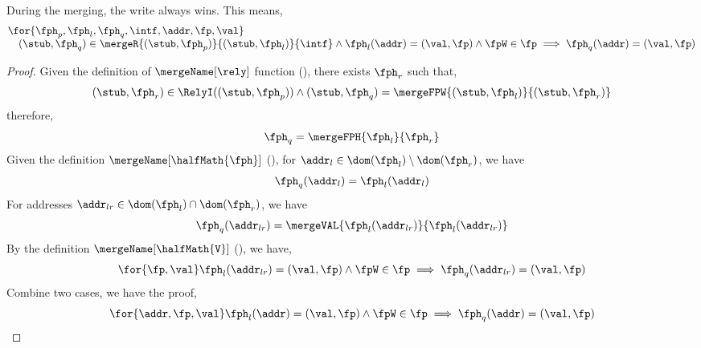 \begin{lem}
\label{lem:write-win-merge}
During the merging, the write always wins.
This means,
\[
\begin{array}{@{}l@{}}
    \for{\fph_{p}, \fph_{l}, \fph_{q}, \intf, \addr, \fp, \val} \\
    \quad (\stub, \fph_{q}) \in \mergeR{(\stub, \fph_{p})}{(\stub, \fph_{l})}{\intf}
    \land \fph_{l}(\addr) = (\val, \fp) 
    \land \fpW \in \fp
    \implies \fph_{q}(\addr) = (\val, \fp)
\end{array}
\]
\end{lem}
\begin{proof}
Given the definition of \( \mergeName[\rely] \) function (), there exists \(  \fph_{r} \) such that,
\[
    (\stub, \fph_{r}) \in \RelyI((\stub, \fph_{p})) \land (\stub, \fph_{q}) = \mergeFPW{(\stub,\fph_{l})}{(\stub,\fph_{r})}
\]
therefore, 
\[
    \fph_{q} = \mergeFPH{\fph_{l}}{\fph_{r}}
\]
Given the definition \( \mergeName[\halfMath{\fph}] \) (), for \( \addr_{l} \in \dom(\fph_{l}) \setminus \dom(\fph_{r})  \), we have 
\[
\fph_{q}(\addr_{l}) = \fph_{l}(\addr_{l})
\]
For addresses \( \addr_{lr} \in \dom(\fph_{l}) \cap \dom(\fph_{r})\), we have 
\[
\fph_{q}(\addr_{lr}) = \mergeVAL{\fph_{l}(\addr_{lr})}{\fph_{l}(\addr_{lr})}
\]
By the definition \( \mergeName[\halfMath{\mathtt{V}}] \) (), we have,
\[
    \for{\fp, \val} \fph_{l}(\addr_{lr}) = (\val, \fp) 
    \land \fpW \in \fp
    \implies \fph_{q}(\addr_{lr}) = (\val, \fp)
\]
Combine two cases, we have the proof, \ie
\[
    \for{ \addr,\fp, \val}
     \fph_{l}(\addr) = (\val, \fp) 
    \land \fpW \in \fp
    \implies \fph_{q}(\addr) = (\val, \fp)
\]
\end{proof}


